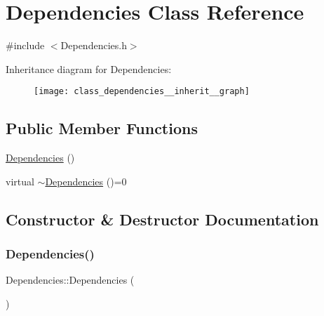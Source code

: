 \hypertarget{class_dependencies}{}\section{Dependencies Class Reference}
\label{class_dependencies}


{\ttfamily \#include $<$Dependencies.\+h$>$}



Inheritance diagram for Dependencies\+:\nopagebreak
\begin{figure}[H]
\begin{center}
\leavevmode
\texttt{[image: class\_dependencies\_\_inherit\_\_graph]}
\end{center}
\end{figure}
\subsection*{Public Member Functions}
\begin{DoxyCompactItemize}
\item 
\hyperlink{class_dependencies_afb4e8de48db17417cb0b3e5b57a17af4}{Dependencies} ()
\item 
virtual \hyperlink{class_dependencies_aeaa0706664765dd19c545f9683bf1aea}{$\sim$\+Dependencies} ()=0
\end{DoxyCompactItemize}


\subsection{Constructor \& Destructor Documentation}
\mbox{\label{class_dependencies_afb4e8de48db17417cb0b3e5b57a17af4}} 
\subsubsection{\texorpdfstring{Dependencies()}{Dependencies()}}
{\footnotesize\ttfamily Dependencies\+::\+Dependencies (\begin{DoxyParamCaption}{ }\end{DoxyParamCaption})}

\mbox{\label{class_dependencies_aeaa0706664765dd19c545f9683bf1aea}} 
